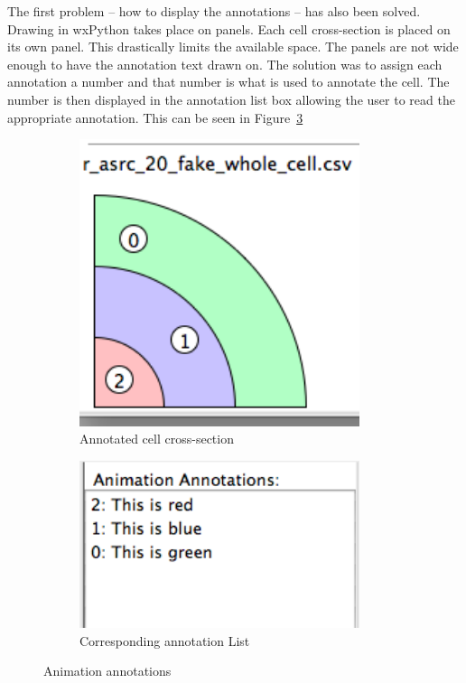 The first problem -- how to display the annotations -- has also been solved.  Drawing in wxPython takes place on panels.  Each cell cross-section is placed on its own panel.  This drastically limits the available space.  The panels are not wide enough to have the annotation text drawn on.  The solution was to assign each annotation a number and that number is what is used to annotate the cell.  The number is then displayed in the annotation list box allowing the user to read the appropriate annotation.  This can be seen in Figure~\ref{fig:annotation_whole}

\begin{figure}[h!]
    \centering
    \begin{subfigure}[b]{0.4\textwidth}
        \centering
        \includegraphics[width=0.9\textwidth]{images/annotation_whole_b.png}
        \caption{Annotated cell cross-section}
        \label{fig:annotation_whole_cell}
    \end{subfigure}
    \begin{subfigure}[b]{0.4\textwidth}
        \centering
        \includegraphics[width=0.9\textwidth]{images/annotation_whole_a.png}
        \caption{Corresponding annotation List}
        \label{fig:annotation_whole_list}
    \end{subfigure}
    \caption{Animation annotations}
    \label{fig:annotation_whole}
\end{figure}

